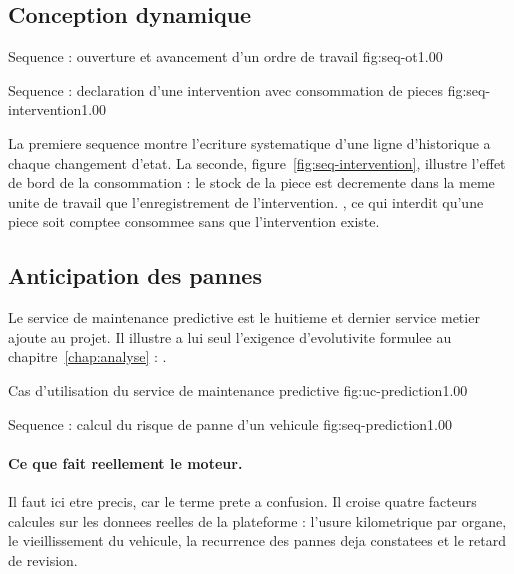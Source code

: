 \subsection{Conception dynamique}

  {Sequence : ouverture et avancement d'un ordre de travail}
  {fig:seq-ot}{1.00}

  {Sequence : declaration d'une intervention avec consommation de pieces}
  {fig:seq-intervention}{1.00}

La premiere sequence montre l'ecriture systematique d'une ligne
d'historique a chaque changement d'etat. La seconde,
figure~\ref{fig:seq-intervention}, illustre l'effet de bord de la
consommation : le stock de la piece est decremente dans la meme unite de
travail que l'enregistrement de l'intervention. , ce qui interdit qu'une piece soit
comptee consommee sans que l'intervention existe.

\subsection{Anticipation des pannes}

Le service de maintenance predictive est le huitieme et dernier service
metier ajoute au projet. Il illustre a lui seul l'exigence d'evolutivite
formulee au chapitre~\ref{chap:analyse} : .

  {Cas d'utilisation du service de maintenance predictive}
  {fig:uc-prediction}{1.00}

  {Sequence : calcul du risque de panne d'un vehicule}
  {fig:seq-prediction}{1.00}

\paragraph{Ce que fait reellement le moteur.}
Il faut ici etre precis, car le terme  prete a
confusion.  Il
croise quatre facteurs calcules sur les donnees reelles de la
plateforme : l'usure kilometrique par organe, le vieillissement du
vehicule, la recurrence des pannes deja constatees et le retard de
revision.


